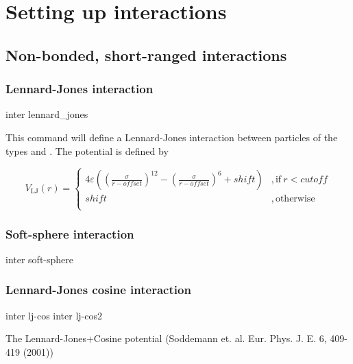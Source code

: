 \chapter{Setting up interactions}
\label{sec:inter}

\section{Non-bonded, short-ranged interactions}
\label{sec:inter-nb}

\subsection{Lennard-Jones interaction}

\begin{essyntax}
  inter  
  lennard_jones 
  \var{$\epsilon$} \var{$\sigma$} 
    
\end{essyntax}
This command will define a Lennard-Jones interaction between particles
of the types  and .  The potential is defined by

\begin{equation}
  V_\mathrm{LJ}(r) = \left\{
    \begin{array}{ll}
      4\varepsilon((\frac{\sigma}{r-\mathit{offset}})^{12}
      -(\frac{\sigma}{r-\mathit{offset}})^6+\mathit{shift}) 
      & \mathrm{, if~} r < \mathit{cutoff}\\
      \mathit{shift} 
      & \mathrm{, otherwise}\\
    \end{array}
  \right.
\end{equation}

\subsection{Soft-sphere interaction}
\begin{essyntax}
  inter   
  soft-sphere    
\end{essyntax}

\subsection{Lennard-Jones cosine interaction}
\begin{essyntax}
  inter   lj-cos
     
  inter   lj-cos2
     \var{$\omega$}
\end{essyntax}
The Lennard-Jones+Cosine potential 
(Soddemann et. al. Eur. Phys. J. E. 6, 409-419 (2001))

